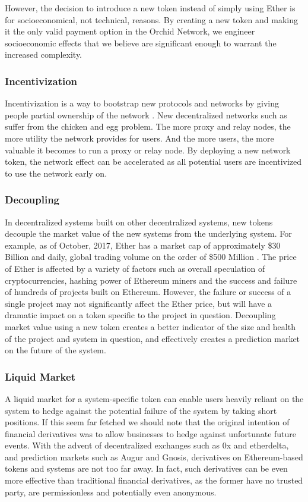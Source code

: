 However, the decision to introduce a new token instead of simply using Ether is for socioeconomical, not technical, reasons. By creating a new token and making it the only valid payment option in the Orchid Network, we engineer socioeconomic effects that we believe are significant enough to warrant the increased complexity.

\subsubsection{Incentivization}
Incentivization is a way to bootstrap new protocols and networks by giving people partial ownership of the network \cite{AppCoins}. New decentralized networks such as \Orchid{} suffer from the chicken and egg problem. The more proxy and relay nodes, the more utility the network provides for users. And the more users, the more valuable it becomes to run a proxy or relay node. By deploying a new network token, the network effect can be accelerated as all potential users are incentivized to use the network early on.

\subsubsection{Decoupling}
In decentralized systems built on other decentralized systems, new tokens decouple the market value of the new systems from the underlying system. For example, as of October, 2017, Ether has a market cap of approximately \$30 Billion and daily, global trading volume on the order of \$500 Million \cite{onchainfx}. The price of Ether is affected by a variety of factors such as overall speculation of cryptocurrencies, hashing power of Ethereum miners and the success and failure of hundreds of projects built on Ethereum. However, the failure or success of a single project may not significantly affect the Ether price, but will have a dramatic impact on a token specific to the project in question. Decoupling market value using a new token creates a better indicator of the size and health of the project and system in question, and effectively creates a prediction market on the future of the system.

\subsubsection{Liquid Market}
A liquid market for a system-specific token can enable users heavily reliant on the system to hedge against the potential failure of the system by taking short positions. If this seem far fetched we should note that the original intention of financial derivatives was to allow businesses to hedge against unfortunate future events. With the advent of decentralized exchanges such as 0x\cite{ETH0x} and etherdelta\cite{EtherDelta}, and prediction markets such as Augur\cite{Augur} and Gnosis\cite{Gnosis}, derivatives on Ethereum-based tokens and systems are not too far away. In fact, such derivatives can be even more effective\cite{ETHDerivatives} than traditional financial derivatives, as the former have no trusted party, are permissionless and potentially even anonymous.

